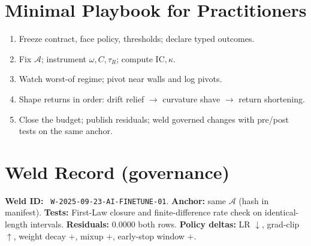 \section{Minimal Playbook for Practitioners}
\label{sec:ai-playbook}
\begin{enumerate}[leftmargin=1.25em]
  \item Freeze contract, face policy, thresholds; declare typed outcomes.
  \item Fix \(\mathcal{A}\); instrument \(\omega, C, \tau_R\); compute \(\mathrm{IC}, \kappa\).
  \item Watch worst-of regime; pivot near walls and log pivots.
  \item Shape returns in order: drift relief \(\rightarrow\) curvature shave \(\rightarrow\) return shortening.
  \item Close the budget; publish residuals; weld governed changes with pre/post tests on the same anchor.
\end{enumerate}

\section{Weld Record (governance)}
\noindent\textbf{Weld ID:} \texttt{ W-2025-09-23-AI-FINETUNE-01}. \;
\textbf{Anchor:} same \(\mathcal{A}\) (hash in manifest). \;
\textbf{Tests:} First-Law closure and finite-difference rate check on identical-length intervals. \;
\textbf{Residuals:} \(0.0000\) both rows. \;
\textbf{Policy deltas:} LR \(\downarrow\), grad-clip \(\uparrow\), weight decay \(+\), mixup \(+\), early-stop window \(+\).
